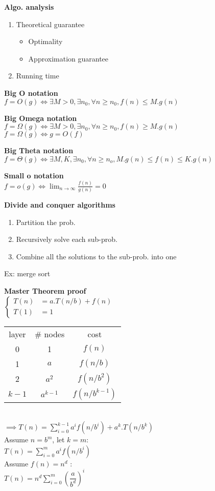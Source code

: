 \documentclass[10pt,letterpaper,landscape]{report}
\newcommand{\boxheight}{21.59cm}
\newcommand{\boxwidth}{8.85cm}
\begin{document}
\begin{small}
{\begin{minipage}[t][\boxheight][c]{\boxwidth}
    \textbf{Algo. analysis}
    \begin{enumerate}
        \item Theoretical guarantee
        \begin{itemize}
            \item Optimality
            \item Approximation guarantee
        \end{itemize}
        \item Running time
    \end{enumerate}
    
    \textbf{Big O notation}\\
    $f = O(g) \iff \exists M>0, \exists n_0, \forall n\geq n_0, f(n) \leq M.g(n)$
    
    \textbf{Big Omega notation}\\
    $f = \Omega(g) \iff \exists M>0, \exists n_0, \forall n\geq n_0, f(n) \geq M.g(n)$ \\
    $f = \Omega(g) \iff g = O(f)$
    
    \textbf{Big Theta notation}\\
    $f = \Theta(g) \iff \exists M, K, \exists n_0, \forall n \geq n_o, M. g(n) \leq f(n) \leq K.g(n)$
    
    \textbf{Small o notation}\\
    $f = o(g) \iff \lim_{n\to \infty} \frac{f(n)}{g(n)} = 0$

    \textbf{Divide and conquer algorithms}
    \begin{enumerate}
        \item Partition the prob.
        \item Recursively solve each sub-prob.
        \item Combine all the solutions to the sub-prob. into one
    \end{enumerate}
    Ex: merge sort
    
    \textbf{Master Theorem proof}\\
    $\left\{\begin{array}{rl}
        T(n) &= a.T(n/b) + f(n)  \\
        T(1) &= 1 
    \end{array}\right.$ \\ 
    \begin{tabular}{c|c|c}
        layer & \# nodes & cost \\
        0 & 1 & $f(n)$ \\
        1 & $a$ & $f(n/b)$ \\
        2 & $a^2$ & $f(n/b^2)$ \\
        $k-1$ & $a^{k-1}$ & $f(n/b^{k-1})$
    \end{tabular} \\
    $ \implies T(n) = \sum_{i=0}^{k-1} a^i f(n/b^i) + a^k.T(n/b^k)$ \\
    Assume $n = b^m$, let $k=m$: \\
    $T(n) = \sum_{i=0}^{m}a^i f(n/b^i)$\\
    Assume $f(n) = n^d$ : \\
    $T(n) = n^d \sum_{i=0}^m \left(\dfrac{a}{b^d}\right)^i$
    

\end{minipage}}
\end{small}
\end{document}
